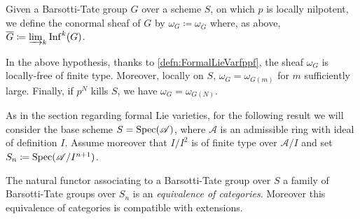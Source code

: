 \begin{defn}
	Given a Barsotti-Tate group $G$ over a scheme $S$, on which $p$ is locally nilpotent,
	we define the conormal sheaf of $G$ by $\omega_G \coloneqq \omega_{\overline{G}}$
	where, as above, $\overline{G} \coloneqq \varinjlim_k \mathrm{Inf}^k(G)$.
\end{defn}


\begin{rem}\label{rem:ConormalSheafBT}
	In the above hypothesis,
	thanks to \cref{defn:FormalLieVarfppf}, 
	the sheaf $\omega_G$ is
	locally-free of finite type.
	Moreover, locally on $S$, $\omega_G = \omega_{G(m)}$ for
	$m$ sufficiently large.
	Finally, if $p^N$ kills $S$, we have $\omega_G = \omega_{G(N)}$.
\end{rem}


\noindent
As in the section regarding formal Lie varieties,
for the following result we will consider the base scheme \(S = \operatorname{Spec}(\mathscr{A})\),
where \(\mathscr{A}\) is an admissible ring with ideal of definition \(I\).
Assume moreover that \(I/I^2\) is of finite type over \(\mathscr{A}/I\) and
set \(S_n \coloneqq \operatorname{Spec}(\mathscr{A}/I^{ n+1 })\).
\begin{lem}\label{lem:BT/admissible}
	The natural functor associating to a Barsotti-Tate group over \(S\)
	a family of Barsotti-Tate groups over \(S_n\) is an
	\emph{equivalence of categories}.
	Moreover this equivalence of categories is compatible
	with extensions.
\end{lem}



